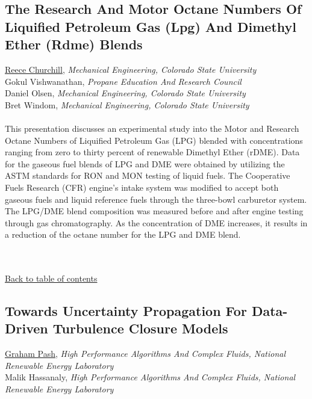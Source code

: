 \hypertarget{ReeceChurchill}{\subsection*{\color{CUGOLD} The Research And Motor Octane Numbers Of Liquified Petroleum Gas (Lpg) And Dimethyl Ether (Rdme) Blends}} \vsp 
\underline{Reece Churchill}, \textit{Mechanical Engineering, Colorado State University}\\ 
{Gokul Vishwanathan}, \textit{Propane Education And Research Council}\\ 
{Daniel Olsen}, \textit{Mechanical Engineering, Colorado State University}\\ 
{Bret Windom}, \textit{Mechanical Engineering, Colorado State University}\\ 
\vspace{-0.1 in} \\ 
\noindent               This presentation discusses an experimental study into the Motor and Research Octane Numbers of Liquified Petroleum Gas (LPG) blended with concentrations ranging from zero to thirty percent of renewable Dimethyl Ether (rDME). Data for the gaseous fuel blends of LPG and DME were obtained by utilizing the ASTM standards for RON and MON testing of liquid fuels. The Cooperative Fuels Research (CFR) engine’s intake system was modified to accept both gaseous fuels and liquid reference fuels through the three-bowl carburetor system. The LPG/DME blend composition was measured before and after engine testing through gas chromatography. As the concentration of DME increases, it results in a reduction of the octane number for the LPG and DME blend. \\ 
\noindent  \\ 
\noindent  \\ 
\begin{flushright}\vspace{-0.2 in}\hyperlink{toc}{Back to table of contents}\end{flushright}\vspace{-0.2 in}
\hypertarget{GrahamPash}{\subsection*{\color{CUGOLD} Towards Uncertainty Propagation For Data-Driven Turbulence Closure Models}} \vsp 
\underline{Graham Pash}, \textit{High Performance Algorithms And Complex Fluids, National Renewable Energy Laboratory}\\ 
{Malik Hassanaly}, \textit{High Performance Algorithms And Complex Fluids, National Renewable Energy Laboratory}\\ 
